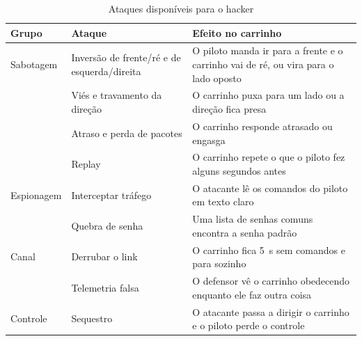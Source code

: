 \documentclass[12pt,openright,oneside,a4paper,english,brazil]{abntex2}
\begin{document}
\begin{table}[htbp]
\centering
\small
\caption{Ataques disponíveis para o hacker}
\label{tab:ataques-jogo}
\begin{tabularx}{\textwidth}{@{}P{2.4cm}P{4.2cm}L@{}}
\toprule
\textbf{Grupo} & \textbf{Ataque} & \textbf{Efeito no carrinho} \\
\midrule
Sabotagem & Inversão de frente/ré e de esquerda/direita & O piloto manda ir para a frente e o carrinho vai de ré, ou vira para o lado oposto \\
 & Viés e travamento da direção & O carrinho puxa para um lado ou a direção fica presa \\
 & Atraso e perda de pacotes & O carrinho responde atrasado ou engasga \\
 & Replay & O carrinho repete o que o piloto fez alguns segundos antes \\
Espionagem & Interceptar tráfego & O atacante lê os comandos do piloto em texto claro \\
 & Quebra de senha & Uma lista de senhas comuns encontra a senha padrão \\
Canal & Derrubar o link & O carrinho fica 5~s sem comandos e para sozinho \\
 & Telemetria falsa & O defensor vê o carrinho obedecendo enquanto ele faz outra coisa \\
Controle & Sequestro & O atacante passa a dirigir o carrinho e o piloto perde o controle \\
\bottomrule
\end{tabularx}
\end{table}
\end{document}
